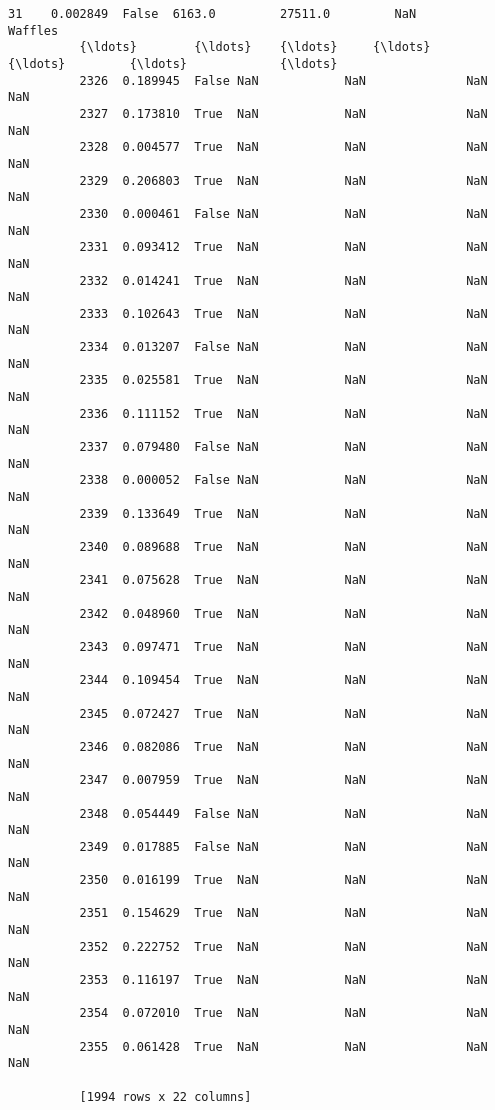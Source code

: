 \documentclass[11pt]{article}
\begin{document}
\begin{Verbatim}[commandchars=\\\{\}]
          31    0.002849  False  6163.0         27511.0         NaN         Waffles    
          {\ldots}        {\ldots}    {\ldots}     {\ldots}             {\ldots}         {\ldots}             {\ldots}    
          2326  0.189945  False NaN            NaN              NaN         NaN        
          2327  0.173810  True  NaN            NaN              NaN         NaN        
          2328  0.004577  True  NaN            NaN              NaN         NaN        
          2329  0.206803  True  NaN            NaN              NaN         NaN        
          2330  0.000461  False NaN            NaN              NaN         NaN        
          2331  0.093412  True  NaN            NaN              NaN         NaN        
          2332  0.014241  True  NaN            NaN              NaN         NaN        
          2333  0.102643  True  NaN            NaN              NaN         NaN        
          2334  0.013207  False NaN            NaN              NaN         NaN        
          2335  0.025581  True  NaN            NaN              NaN         NaN        
          2336  0.111152  True  NaN            NaN              NaN         NaN        
          2337  0.079480  False NaN            NaN              NaN         NaN        
          2338  0.000052  False NaN            NaN              NaN         NaN        
          2339  0.133649  True  NaN            NaN              NaN         NaN        
          2340  0.089688  True  NaN            NaN              NaN         NaN        
          2341  0.075628  True  NaN            NaN              NaN         NaN        
          2342  0.048960  True  NaN            NaN              NaN         NaN        
          2343  0.097471  True  NaN            NaN              NaN         NaN        
          2344  0.109454  True  NaN            NaN              NaN         NaN        
          2345  0.072427  True  NaN            NaN              NaN         NaN        
          2346  0.082086  True  NaN            NaN              NaN         NaN        
          2347  0.007959  True  NaN            NaN              NaN         NaN        
          2348  0.054449  False NaN            NaN              NaN         NaN        
          2349  0.017885  False NaN            NaN              NaN         NaN        
          2350  0.016199  True  NaN            NaN              NaN         NaN        
          2351  0.154629  True  NaN            NaN              NaN         NaN        
          2352  0.222752  True  NaN            NaN              NaN         NaN        
          2353  0.116197  True  NaN            NaN              NaN         NaN        
          2354  0.072010  True  NaN            NaN              NaN         NaN        
          2355  0.061428  True  NaN            NaN              NaN         NaN        
          
          [1994 rows x 22 columns]
\end{Verbatim}
            
\end{document}
